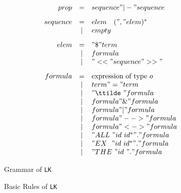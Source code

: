 \begin{figure} 
\dquotes
\[\begin{array}{rcl}
    prop & = & sequence " |- " sequence 
\\[2ex]
sequence & = & elem \quad (", " elem)^* \\
         & | & empty 
\\[2ex]
    elem & = & "\$ " term \\
         & | & formula  \\
         & | & "<<" sequence ">>" 
\\[2ex]
 formula & = & \hbox{expression of type~$o$} \\
         & | & term " = " term \\
         & | & "\ttilde\ " formula \\
         & | & formula " \& " formula \\
         & | & formula " | " formula \\
         & | & formula " --> " formula \\
         & | & formula " <-> " formula \\
         & | & "ALL~" id~id^* " . " formula \\
         & | & "EX~~" id~id^* " . " formula \\
         & | & "THE~" id~     " . " formula
  \end{array}
\]
\caption{Grammar of {\tt LK}} \label{lk-grammar}
\end{figure}




\begin{figure} 

\caption{Basic Rules of {\tt LK}}  \label{lk-basic-rules}
\end{figure}

